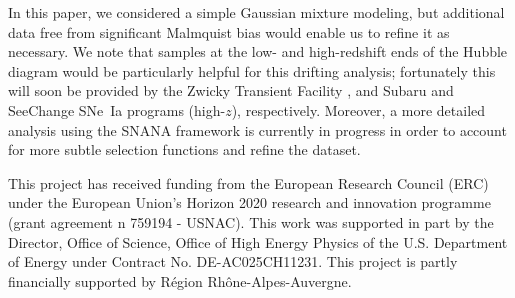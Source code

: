 \documentclass[]{aa}
\newcommand{\nn}[1]{\textcolor[rgb]{0.25, 0.50, 0}{#1}}
\begin{document}
In this paper, we considered a simple Gaussian mixture modeling, but additional
data free from significant Malmquist bias would enable us to refine it as
necessary. We note that samples at the low- and high-redshift ends of the Hubble
diagram would be particularly helpful for this drifting analysis; fortunately
this will soon be provided by the Zwicky Transient Facility
\citep[low-$z$,][]{bellm2019, graham2019}, and Subaru and SeeChange SNe~Ia
programs (high-$z$), respectively. \nn{Moreover, a more detailed analysis using
the SNANA framework is currently in progress in order to account for more subtle
selection functions and refine the dataset.}

\begin{acknowledgements}
    This project has received funding from the European Research Council (ERC)
    under the European Union's Horizon 2020 research and innovation programme
    (grant agreement n 759194 - USNAC).
    This work was supported in part by the Director, Office of Science, Office
    of High Energy Physics of the U.S. Department of Energy under Contract No.
    DE-AC025CH11231.
    This project is partly financially supported by Région Rhône-Alpes-Auvergne.
\end{acknowledgements}
\end{document}

